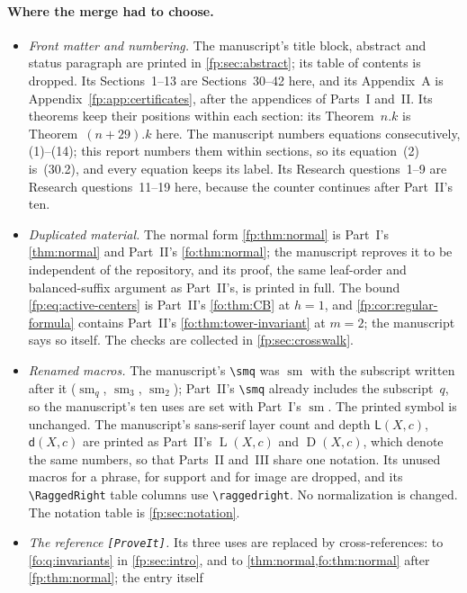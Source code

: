 \documentclass[11pt,letterpaper]{article}
\numberwithin{equation}{section}
\theoremstyle{definition}
\theoremstyle{remark}
\theoremstyle{definition}
\newcommand{\sm}{\operatorname{sm}}
\newcommand{\depth}{\operatorname{D}}
\newcommand{\layers}{\operatorname{L}}
\newcommand{\smq}{\operatorname{sm}_{q}}
\begin{document}
\paragraph{Where the merge had to choose.}
\begin{itemize}
\item \emph{Front matter and numbering.} The manuscript's title block,
abstract and status paragraph are printed in \cref{fp:sec:abstract}; its
table of contents is dropped. Its Sections~1--13 are Sections~30--42 here,
and its Appendix~A is Appendix~\ref{fp:app:certificates}, after the
appendices of Parts~I and~II. Its theorems keep their positions within each
section: its Theorem~$n.k$ is Theorem~$(n+29).k$ here. The manuscript numbers
equations consecutively, (1)--(14); this report numbers them within sections,
so its equation~(2) is~(30.2), and every equation keeps its label. Its
Research questions~1--9 are Research questions~11--19 here, because the
counter continues after Part~II's ten.
\item \emph{Duplicated material.} The normal form \cref{fp:thm:normal} is
Part~I's \cref{thm:normal} and Part~II's \cref{fo:thm:normal}; the manuscript
reproves it to be independent of the repository, and its proof, the same
leaf-order and balanced-suffix argument as Part~II's, is printed in full. The
bound \eqref{fp:eq:active-centers} is Part~II's \cref{fo:thm:CB} at $h=1$,
and \cref{fp:cor:regular-formula} contains Part~II's
\cref{fo:thm:tower-invariant} at $m=2$; the manuscript says so itself. The
checks are collected in \cref{fp:sec:crosswalk}.
\item \emph{Renamed macros.} The manuscript's \verb|\smq| was
$\operatorname{sm}$ with the subscript written after it ($\sm_q$, $\sm_3$,
$\sm_2$); Part~II's \verb|\smq| already includes the subscript~$q$, so the
manuscript's ten uses are set with Part~I's $\sm$. The printed symbol is
unchanged. The manuscript's sans-serif layer count and depth
$\mathsf L(X,c)$, $\mathsf d(X,c)$ are printed as Part~II's
$\layers(X,c)$ and $\depth(X,c)$, which denote the same numbers, so that
Parts~II and~III share one notation. Its unused macros for a phrase, for
support and for image are dropped, and its \verb|\RaggedRight| table columns
use \verb|\raggedright|. No normalization is changed. The notation table is
\cref{fp:sec:notation}.
\item \emph{The reference \texttt{[ProveIt]}.} Its three uses are replaced by
cross-references: to \cref{fo:q:invariants} in \cref{fp:sec:intro}, and to
\cref{thm:normal,fo:thm:normal} after \cref{fp:thm:normal}; the entry itself

\end{itemize}
\end{document}
